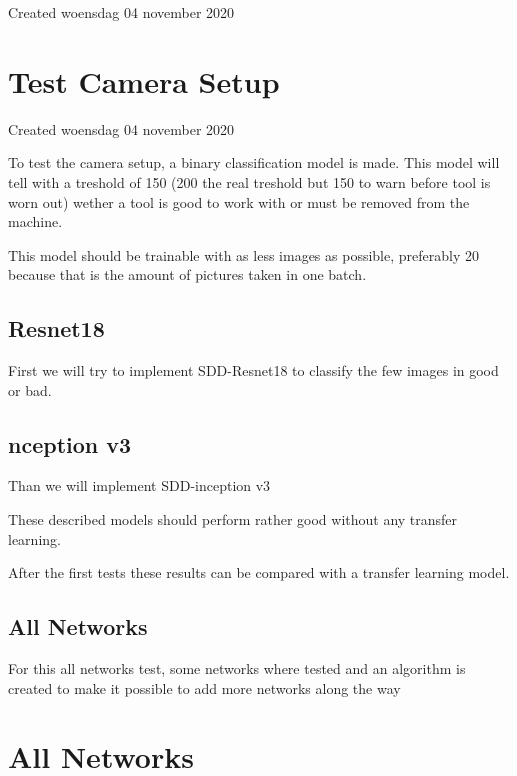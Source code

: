 \documentclass{article}
\begin{document}
Created woensdag 04 november 2020




		\section{Test Camera Setup}

Created woensdag 04 november 2020



To test the camera setup, a binary classification model is made. This model will tell with a treshold of 150 (200 the real treshold but 150 to warn before tool is worn out) wether a tool is good to work with or must be removed from the machine. 

This model should be trainable with as less images as possible, preferably 20 because that is the amount of pictures taken in one batch.





\subsection{Resnet18}

First we will try to implement SDD-Resnet18 to classify the few images in good or bad. 



\subsection{nception v3}

Than we will implement SDD-inception v3 



These described models should perform rather good without any transfer learning. 

After the first tests these results can be compared with a transfer learning model.





\subsection{All Networks}

For this all networks test, some networks where tested and an algorithm is created to make it possible to add more networks along the way


		\section{All Networks}
\end{document}
